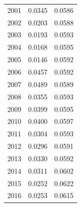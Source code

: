 \documentclass[12pt,]{article}
\begin{document}
\begin{table}[ht]
{\begin{tabular}{rrr}
   2001 & 0.0345 & 0.0586 \\ 
   2002 & 0.0203 & 0.0588 \\ 
   2003 & 0.0193 & 0.0593 \\ 
   2004 & 0.0168 & 0.0595 \\ 
   2005 & 0.0146 & 0.0592 \\ 
   2006 & 0.0457 & 0.0592 \\ 
   2007 & 0.0489 & 0.0589 \\ 
   2008 & 0.0355 & 0.0593 \\ 
   2009 & 0.0399 & 0.0595 \\ 
   2010 & 0.0400 & 0.0597 \\ 
   2011 & 0.0304 & 0.0593 \\ 
   2012 & 0.0296 & 0.0591 \\ 
   2013 & 0.0330 & 0.0592 \\ 
   2014 & 0.0311 & 0.0602 \\ 
   2015 & 0.0252 & 0.0622 \\ 
   2016 & 0.0253 & 0.0615 \\ 
   \hline
\end{tabular}
}
\end{table}

\FloatBarrier
\end{document}
